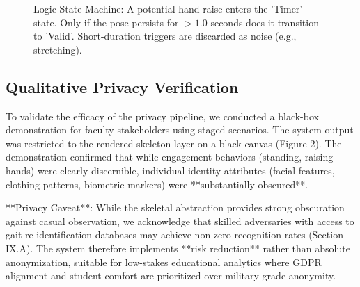 \documentclass[conference]{IEEEtran}
\begin{document}
\begin{figure}[htbp]
\centering
{}

\caption{Logic State Machine: A potential hand-raise enters the 'Timer' state. Only if the pose persists for $>1.0$ seconds does it transition to 'Valid'. Short-duration triggers are discarded as noise (e.g., stretching).}
\label{fig:fsm}
\end{figure}

\subsection{Qualitative Privacy Verification}
To validate the efficacy of the privacy pipeline, we conducted a black-box demonstration for faculty stakeholders using staged scenarios. The system output was restricted to the rendered skeleton layer on a black canvas (Figure 2). The demonstration confirmed that while engagement behaviors (standing, raising hands) were clearly discernible, individual identity attributes (facial features, clothing patterns, biometric markers) were **substantially obscured**.

**Privacy Caveat**: While the skeletal abstraction provides strong obscuration against casual observation, we acknowledge that skilled adversaries with access to gait re-identification databases may achieve non-zero recognition rates (Section IX.A). The system therefore implements **risk reduction** rather than absolute anonymization, suitable for low-stakes educational analytics where GDPR alignment and student comfort are prioritized over military-grade anonymity.
\end{document}
